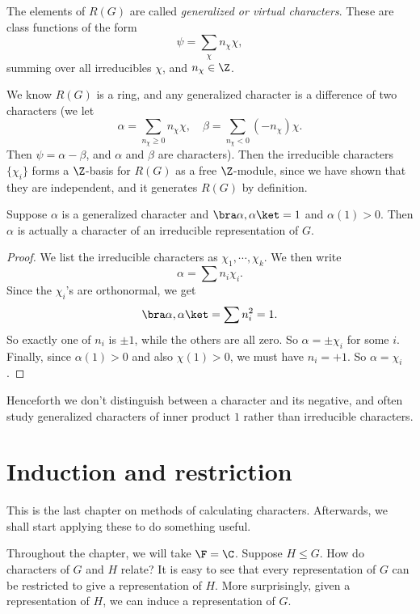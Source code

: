 \documentclass[a4paper]{article}
\begin{document}
\begin{defi}
  The elements of $R(G)$ are called \emph{generalized or virtual characters}. These are class functions of the form
  \[
    \psi = \sum_{\chi} n_\chi \chi,
  \]
  summing over all irreducibles $\chi$, and $n_\chi \in \Z$.
\end{defi}

We know $R(G)$ is a ring, and any generalized character is a difference of two characters (we let
\[
  \alpha = \sum_{n_\chi \geq 0} n_\chi \chi,\quad \beta = \sum_{n_\chi < 0}(-n_\chi) \chi.
\]
Then $\psi = \alpha - \beta$, and $\alpha$ and $\beta$ are characters). Then the irreducible characters $\{\chi_i\}$ forms a $\Z$-basis for $R(G)$ as a free $\Z$-module, since we have shown that they are independent, and it generates $R(G)$ by definition.

\begin{lemma}
  Suppose $\alpha$ is a generalized character and $\bra \alpha, \alpha\ket = 1$ and $\alpha (1) > 0$. Then $\alpha$ is actually a character of an irreducible representation of $G$.
\end{lemma}

\begin{proof}
  We list the irreducible characters as $\chi_1, \cdots, \chi_k$. We then write
  \[
    \alpha = \sum n_i \chi_i.
  \]
  Since the $\chi_i$'s are orthonormal, we get
  \[
    \bra \alpha, \alpha\ket = \sum n_i^2 = 1.
  \]
  So exactly one of $n_i$ is $\pm 1$, while the others are all zero. So $\alpha = \pm \chi_i$ for some $i$. Finally, since $\alpha(1) > 0$ and also $\chi(1) > 0$, we must have $n_i = +1$. So $\alpha = \chi_i$.
\end{proof}
Henceforth we don't distinguish between a character and its negative, and often study generalized characters of inner product $1$ rather than irreducible characters.

\section{Induction and restriction}
This is the last chapter on methods of calculating characters. Afterwards, we shall start applying these to do something useful.

Throughout the chapter, we will take $\F = \C$. Suppose $H \leq G$. How do characters of $G$ and $H$ relate? It is easy to see that every representation of $G$ can be restricted to give a representation of $H$. More surprisingly, given a representation of $H$, we can induce a representation of $G$.
\end{document}
